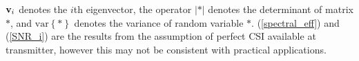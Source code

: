 \documentclass[10pt,fleqn, twocolumn]{IEEEtran}
\newcommand{\bv}{{\bf v}}
\begin{document}
\noindent $\bv_{i}$ denotes the $i$th eigenvector, the operator
$\left|\ast\right|$ denotes the determinant of matrix $\ast$, and
$\mbox{var}\left\{\ast\right\}$ denotes the variance of random
variable $\ast$. (\ref{spectral_eff}) and (\ref{SNR_i}) are the
results from the assumption of perfect CSI available at
transmitter, however this may not be consistent with practical
applications.
\begin{figure}
\end{figure}
\end{document}
